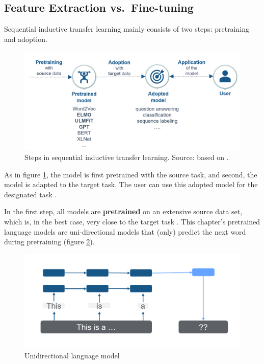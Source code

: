 \documentclass[]{krantz}
\begin{document}
\hypertarget{feature-extraction-vs.fine-tuning}{%
\subsection{Feature Extraction vs.~Fine-tuning}\label{feature-extraction-vs.fine-tuning}}

Sequential inductive transfer learning mainly consists of two steps: pretraining and adoption.



\begin{figure}

{\centering \includegraphics[width=\textwidth]{figures/02-01-transfer-learning-for-nlp-1/sequential-transfer-learning-new} 

}

\caption{Steps in sequential inductive transfer learning. Source: based on \citet{ruder2019transfer}.}\label{fig:ch21-sequentialinductivetl}
\end{figure}

As in figure \ref{fig:ch21-sequentialinductivetl}, the model is first pretrained with the source task, and second, the model is adapted to the target task. The user can use this adopted model for the designated task \citep{ruder2019transfer}.

In the first step, all models are \textbf{pretrained} on an extensive source data set, which is, in the best case, very close to the target task \citep{peterrudersmith2019}. This chapter's pretrained language models are uni-directional models that (only) predict the next word during pretraining (figure \ref{fig:ch21-lm}).

\begin{figure}

{\centering \includegraphics[width=0.8\linewidth]{figures/02-01-transfer-learning-for-nlp-1/pretrained-lm-new} 

}

\caption{Unidirectional language model}\label{fig:ch21-lm}
\end{figure}
\end{document}
